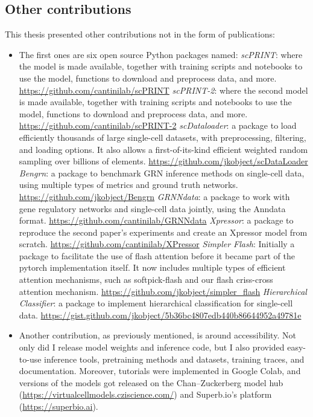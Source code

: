 \subsection{Other contributions}

This thesis presented other contributions not in the form of publications:

\begin{itemize}
 \item The first ones are six open source Python packages named:
   \subitem \emph{\gls{scPRINT}}: where the model is made available, together with training scripts and notebooks to use the model, functions to download and preprocess data, and more. \url{https://github.com/cantinilab/scPRINT}
   \subitem \emph{scPRINT-2}: where the second model is made available, together with training scripts and notebooks to use the model, functions to download and preprocess data, and more. \url{https://github.com/cantinilab/scPRINT-2}
   \subitem \emph{scDataloader}: a package to load efficiently thousands of large single-cell datasets, with preprocessing, filtering, and loading options. It also allows a first-of-its-kind efficient weighted random sampling over billions of elements. \url{https://github.com/jkobject/scDataLoader}
   \subitem \emph{Bengrn}: a package to benchmark \gls{GRN} inference methods on single-cell data, using multiple types of metrics and ground truth networks. \url{https://github.com/jkobject/Bengrn}
   \subitem \emph{GRNNdata}: a package to work with gene regulatory networks and single-cell data jointly, using the Anndata format. \url{https://github.com/cantinilab/GRNNdata}
   \subitem \emph{Xpressor}: a package to reproduce the second paper's experiments and create an Xpressor model from scratch. \url{https://github.com/cantinilab/XPressor}
   \subitem \emph{Simpler Flash}: Initially a package to facilitate the use of flash attention before it became part of the pytorch implementation itself. It now includes multiple types of efficient attention mechanisms, such as softpick-flash and our flash criss-cross attention mechanism. \url{https://github.com/jkobject/simpler_flash}
   \subitem \emph{Hierarchical Classifier}: a package to implement hierarchical classification for single-cell data. \url{https://gist.github.com/jkobject/5b36bc4807edb440b86644952a49781e}
\item Another contribution, as previously mentioned, is around accessibility. Not only did I release model weights and inference code, but I also provided easy-to-use inference tools, pretraining methods and datasets, training traces, and documentation. Moreover, tutorials were implemented in Google Colab, and versions of the models got released on the Chan–Zuckerberg model hub (\url{https://virtualcellmodels.cziscience.com/}) and Superb.io's platform (\url{https://superbio.ai}).

\end{itemize}
